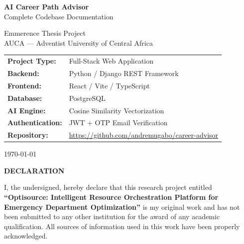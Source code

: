 \documentclass[12pt, a4paper]{article}
\begin{document}
\begin{titlepage}
\centering
\vspace*{3cm}

{\Huge\bfseries\color{primary} AI Career Path Advisor\\[0.3cm]}
{\LARGE\color{accent} Complete Codebase Documentation\\[0.5cm]}

\vspace{1cm}
{\large\color{gray} Emmerence Thesis Project\\[0.3cm]}
{\large AUCA --- Adventist University of Central Africa\\[0.5cm]}

\vspace{2cm}

\begin{tabular}{ll}
\textbf{Project Type:} & Full-Stack Web Application \\
\textbf{Backend:} & Python / Django REST Framework \\
\textbf{Frontend:} & React / Vite / TypeScript \\
\textbf{Database:} & PostgreSQL \\
\textbf{AI Engine:} & Cosine Similarity Vectorization \\
\textbf{Authentication:} & JWT + OTP Email Verification \\
\textbf{Repository:} & \url{https://github.com/andremugabo/career-advisor} \\
\end{tabular}

\vfill
{\large \today}
\end{titlepage}


\newpage
\vspace*{2cm}
\begin{center}
    \Large\bfseries\color{primary} DECLARATION
\end{center}
\vspace{1.5cm}
I, the undersigned, hereby declare that this research project entitled \textbf{``Optisource: Intelligent Resource Orchestration Platform for Emergency Department Optimization''} is my original work and has not been submitted to any other institution for the award of any academic qualification. All sources of information used in this work have been properly acknowledged.
\vspace{2cm}
\end{document}
